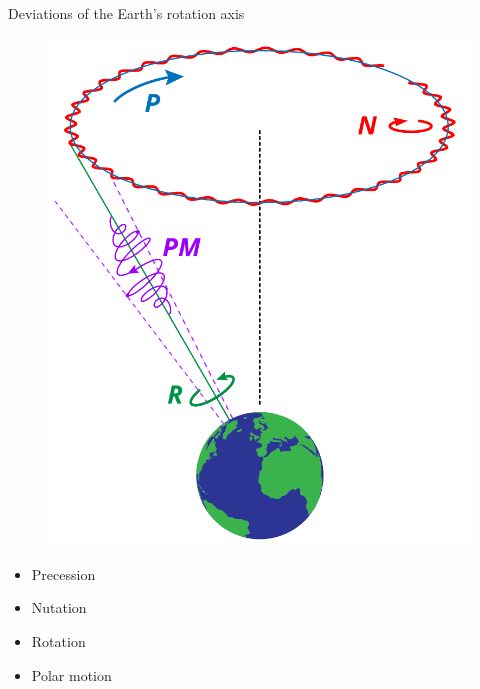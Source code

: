 \documentclass{beamer} %
\begin{document}
\begin{frame}{Deviations of the Earth's rotation axis}
  \begin{minipage}{0.49\textwidth}
    \begin{figure}
      \centering
      \includegraphics[width=\textwidth]{../Images/precession_nutation.pdf}
    \end{figure}
  \end{minipage}
  \begin{minipage}{0.49\textwidth}
    \begin{itemize}
      \item \textcolor[RGB]{0,113,188}{{Precession}}
      \item \textcolor[RGB]{255,0,0}{{Nutation}}
      \item \textcolor[RGB]{0,146,70}{{Rotation}}
      \item \textcolor[RGB]{158,0,255}{{Polar motion}}
    \end{itemize}
    \vspace{1cm}
    \begin{figure}
      \centering
      \href{https://youtu.be/KnPk2T_kpco}{
}
\end{figure}
\end{minipage}
\end{frame}
\end{document}
